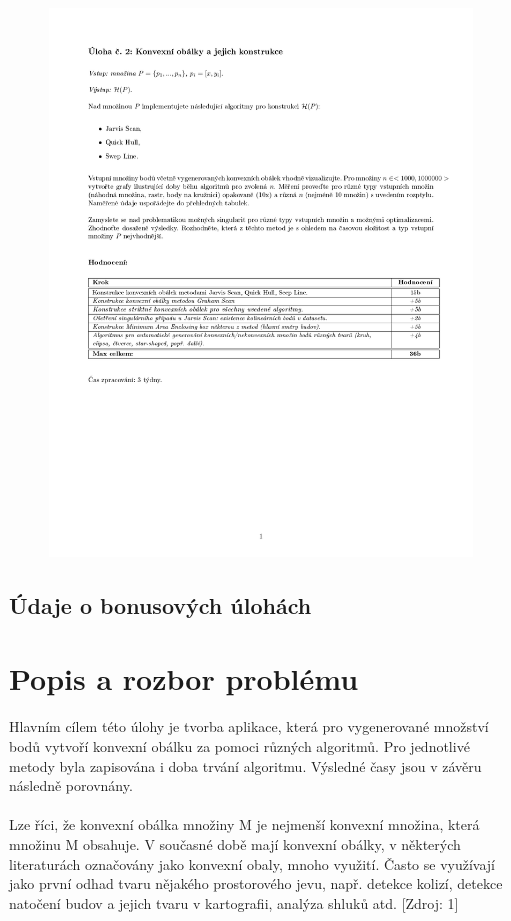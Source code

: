 \documentclass[a4paper, 12pt]{article}
\begin{document}
\begin{figure}[h!]
	\centering
	\includegraphics[clip, trim=0cm 10cm 0cm 3cm, width=1.2\textwidth]{zadani.pdf}
\end{figure}

\subsection{Údaje o bonusových úlohách}



\clearpage

\section{Popis a rozbor problému}
Hlavním cílem této úlohy je tvorba aplikace, která pro vygenerované množství bodů vytvoří konvexní obálku za pomoci různých algoritmů. Pro jednotlivé metody byla zapisována i doba trvání algoritmu. Výsledné časy jsou v závěru následně porovnány.\\
\\
Lze říci, že konvexní obálka množiny M je nejmenší konvexní množina, která množinu M obsahuje. V současné době mají konvexní obálky, v některých literaturách označovány jako konvexní obaly, mnoho využití. Často se využívají jako první odhad tvaru nějakého prostorového jevu, např. detekce kolizí, detekce natočení budov a jejich tvaru v kartografii, analýza shluků atd. [Zdroj: 1]
\\
\end{document}
